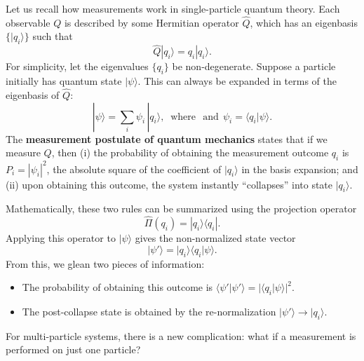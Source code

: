 \documentclass[pra,12pt]{revtex4}
\begin{document}
Let us recall how measurements work in single-particle quantum theory.
Each observable $Q$ is described by some Hermitian operator $\hat{Q}$,
which has an eigenbasis $\{|q_i\rangle\}$ such that
\begin{equation}
  \hat{Q}|q_i\rangle = q_i |q_i\rangle.
\end{equation}
For simplicity, let the eigenvalues $\{q_i\}$ be non-degenerate.
Suppose a particle initially has quantum state $|\psi\rangle$.  This
can always be expanded in terms of the eigenbasis of $\hat{Q}$:
\begin{equation}
  |\psi\rangle = \sum_i \psi_i\, |q_i\rangle, \;\;\mathrm{where}\;\;\,\textrm{and}\;\, \psi_i = \langle q_i|\psi\rangle.
\end{equation}
The \textbf{measurement postulate of quantum mechanics} states that if
we measure $Q$, then (i) the probability of obtaining the measurement
outcome $q_i$ is $P_i = |\psi_i|^2$, the absolute square of the
coefficient of $|q_i\rangle$ in the basis expansion; and (ii) upon
obtaining this outcome, the system instantly ``collapses'' into state
$|q_i\rangle$.

Mathematically, these two rules can be summarized using the projection
operator
\begin{equation}
  \hat{\Pi}(q_i) = |q_i\rangle\langle q_i|.
\end{equation}
Applying this operator to $|\psi\rangle$ gives the non-normalized
state vector
\begin{equation}
  |\psi'\rangle = |q_i\rangle \langle q_i|\psi\rangle.
\end{equation}
From this, we glean two pieces of information:
\begin{itemize}
\item The probability of obtaining this outcome is
  $\langle\psi'|\psi'\rangle = |\langle q_i|\psi\rangle|^2$.

\item The post-collapse state is obtained by the re-normalization
  $|\psi'\rangle \rightarrow |q_i\rangle$.
\end{itemize}

For multi-particle systems, there is a new complication: what if a
measurement is performed on just one particle?
\end{document}
